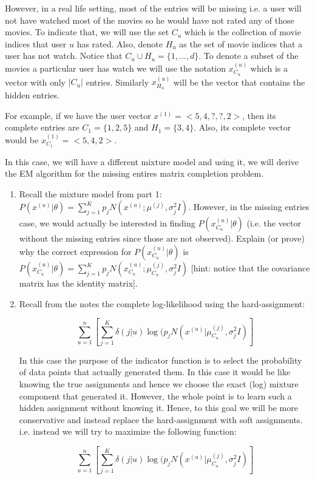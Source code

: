 \begin{enumerate}
However, in a real life setting, most of the entries will be missing i.e. a user will not have watched most of the movies so he would have not rated any of those movies. To indicate that, we will use the set $C_{u}$ which is the collection of movie indices that user $u$ has rated. Also, denote $H_{u}$ as the set of movie indices that a user has not watch. Notice that $C_{u} \cup H_{u} = \{1, ... , d \}$. To denote a subset of the movies a particular user has watch we will use the notation $x^{(u)}_{C_u}$ which is a vector with only $|C_u|$ entries. Similarly $x^{(u)}_{H_u}$ will be the vector that contains the hidden entries.

For example, if we have the user vector $x^{(1)} = < 5, 4, ?, ?, 2>$, then its complete entries are $C_{1} = \{ 1, 2, 5\}$ and $H_{1} = \{ 3, 4\}$. Also, its complete vector would be $x^{(1)}_{C_1} = < 5, 4, 2>$.

In this case, we will have a different mixture model and using it, we will derive the EM algorithm for the missing entires matrix completion problem.

\begin{enumerate}

\item Recall the mixture model from part 1: $P(x^{(u)} | \theta) = \sum^{K}_{j=1} p_j N(x^{(u)}; \mu^{(j)}, \sigma^2_j I) $. However, in the missing entries case, we would actually be interested in finding $P(x^{(u)}_{C_u} | \theta)$ (i.e. the vector without the missing entries since those are not observed). Explain (or prove) why the correct expression for $P(x^{(u)}_{C_u} | \theta)$ is$P(x^{(u)}_{C_u}  | \theta) = \sum^{K}_{j=1} p_j N(x^{(u)}_{C_u} ; \mu^{(j)}_{C_u} , \sigma^2_j I) $ [hint: notice that the covariance matrix has the identity matrix].

\item Recall from the notes the complete log-likelihood using the hard-assignment:

$$ \sum^n_{u=1} \left[ \sum^{K}_{j=1} \delta(j|u) \log( p_j N(x^{(u)} | \mu^{(j)}_{C_u}, \sigma^2_j I) \right]$$

In this case the purpose of the indicator function is to select the probability of data points that actually generated them. In this case it would be like knowing the true assignments and hence we choose the exact (log) mixture component that generated it. However, the whole point is to learn such a hidden assignment without knowing it. Hence, to this goal we will be more conservative and instead replace the hard-assignment with soft assignments. i.e. instead we will try to maximize the following function:

$$ \sum^n_{u=1} \left[ \sum^{K}_{j=1} \delta(j|u) \log( p_j N(x^{(u)} | \mu^{(j)}_{C_u}, \sigma^2_j I) \right]$$


\end{enumerate} 


\end{enumerate}





